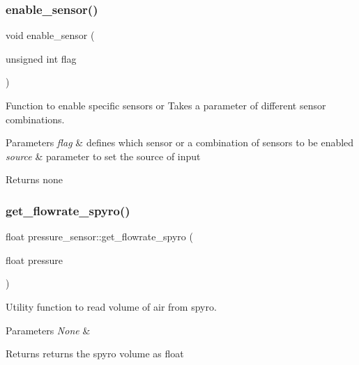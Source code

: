 \subsubsection{\texorpdfstring{enable\+\_\+sensor()}{enable\_sensor()}}
{\footnotesize\ttfamily void enable\+\_\+sensor (\begin{DoxyParamCaption}\item[{unsigned int}]{flag }\end{DoxyParamCaption})}



Function to enable specific sensors or Takes a parameter of different sensor combinations. 


\begin{DoxyParams}{Parameters}
{\em flag} & defines which sensor or a combination of sensors to be enabled\\
\hline
{\em source} & parameter to set the source of input\\
\hline
\end{DoxyParams}
\begin{DoxyReturn}{Returns}
none 
\end{DoxyReturn}
\mbox{\label{group___ventilator_module_ga4a650b2c4cb1b55f8be3a4c129d4f12a}} 
\subsubsection{\texorpdfstring{get\+\_\+flowrate\+\_\+spyro()}{get\_flowrate\_spyro()}}
{\footnotesize\ttfamily float pressure\+\_\+sensor\+::get\+\_\+flowrate\+\_\+spyro (\begin{DoxyParamCaption}\item[{float}]{pressure }\end{DoxyParamCaption})\hspace{0.3cm}{\ttfamily [protected]}}



Utility function to read volume of air from spyro. 


\begin{DoxyParams}{Parameters}
{\em None} & \\
\hline
\end{DoxyParams}
\begin{DoxyReturn}{Returns}
returns the spyro volume as float 
\end{DoxyReturn}
\mbox{\label{group___ventilator_module_ga5f113f838045ef7cd582cebfcd00c4f0}} 
